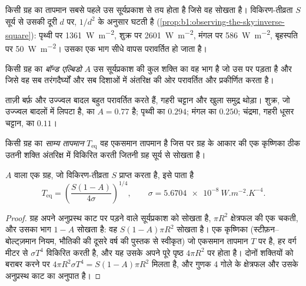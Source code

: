 किसी ग्रह का तापमान सबसे पहले उस सूर्यप्रकाश से तय होता है जिसे वह सोखता है। विकिरण-तीव्रता $S$ सूर्य से उसकी दूरी $d$
पर, $1/d^2$ के अनुसार घटती है (\cref{prop:b1:observing-the-sky:inverse-square}):
पृथ्वी पर \qty{1361}{W.m^{-2}}, शुक्र पर \qty{2601}{W.m^{-2}}, मंगल पर \qty{586}{W.m^{-2}},
बृहस्पति पर \qty{50}{W.m^{-2}}। उसका एक भाग सीधे वापस परावर्तित हो जाता है।

\begin{definition}[बॉन्ड एल्बिडो]\label{def:b1:comparative-planetology:albedo}
किसी ग्रह का \emph{बॉन्ड एल्बिडो} $A$ उस सूर्यप्रकाश की कुल शक्ति का वह भाग है
जो उस पर पड़ता है और जिसे वह सब तरंगदैर्घ्यों और सब दिशाओं में अंतरिक्ष की ओर परावर्तित और
प्रकीर्णित करता है।
\end{definition}

ताज़ी बर्फ़ और उज्ज्वल बादल बहुत परावर्तित करते हैं, गहरी चट्टान और खुला समुद्र थोड़ा। शुक्र, जो
उज्ज्वल बादलों में लिपटा है, का $A = 0.77$ है; पृथ्वी का $0.294$; मंगल का $0.250$; चंद्रमा, गहरी
धूसर चट्टान, का $0.11$।

\begin{definition}[साम्य तापमान]\label{def:b1:comparative-planetology:equilibrium-temperature}
किसी ग्रह का \emph{साम्य तापमान} $T_\mathrm{eq}$ वह एकसमान तापमान है जिस पर
ग्रह के आकार की एक कृष्णिका ठीक उतनी शक्ति अंतरिक्ष में विकिरित करती जितनी ग्रह सूर्य से सोखता है।
\end{definition}

\begin{proposition}[साम्य तापमान]\label{prop:b1:comparative-planetology:teq}
 $A$ वाला एक ग्रह, जो विकिरण-तीव्रता $S$ प्राप्त करता है, इसे पाता है
\[
  T_\mathrm{eq} = \left(\frac{S(1 - A)}{4\sigma}\right)^{1/4},
  \qquad \sigma = \qty{5.6704e-8}{W.m^{-2}.K^{-4}} .
\]
\end{proposition}

\begin{proof}
ग्रह अपने अनुप्रस्थ काट पर पड़ने वाले सूर्यप्रकाश को सोखता है, $\pi R^2$ क्षेत्रफल की एक चकती, और उसका
भाग $1 - A$ सोखता है: वह $S(1 - A)\pi
R^2$ सोखता है। एक कृष्णिका (स्टीफ़न–बोल्ट्ज़मान नियम, भौतिकी की
दूसरे वर्ष की पुस्तक से स्वीकृत) जो एकसमान तापमान $T$ पर है, हर वर्ग मीटर से
$\sigma T^4$ विकिरित करती है, और यह उसके अपने पूरे पृष्ठ $4\pi R^2$ पर होता है। दोनों शक्तियों को बराबर करने पर
$4\pi R^2\sigma T^4 = S(1 - A)\pi R^2$ मिलता है, और गुणक 4 गोले के क्षेत्रफल और उसके अनुप्रस्थ काट का अनुपात है।
\end{proof}

